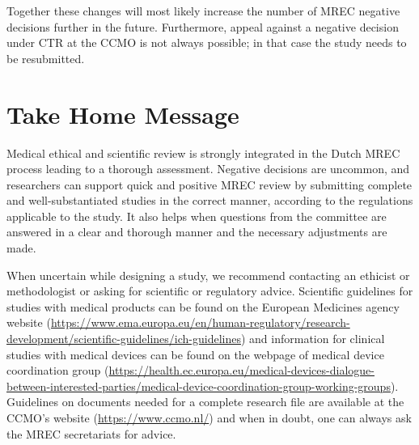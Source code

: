 \documentclass[authordate, empirical]{jote-new-article}
\begin{document}
	Together these changes will most likely increase the number of MREC negative decisions further in the future. Furthermore, appeal against a negative decision under CTR at the CCMO is not always possible; in that case the study needs to be resubmitted.







	\section{Take Home Message}



	Medical ethical and scientific review is strongly integrated in the Dutch MREC process leading to a thorough assessment. Negative decisions are uncommon, and researchers can support quick and positive MREC review by submitting complete and well-substantiated studies in the correct manner, according to the regulations applicable to the study. It also helps when questions from the committee are answered in a clear and thorough manner and the necessary adjustments are made.







	When uncertain while designing a study, we recommend contacting an ethicist or methodologist or asking for scientific or regulatory advice. Scientific guidelines for studies with medical products can be found on the European Medicines agency website (\href{https://www.ema.europa.eu/en/human-regulatory/research-development/scientific-guidelines/ich-guidelines}{https://www.ema.europa.eu/en/human-regulatory/research-development/scientific-guidelines/ich-guidelines}) and information for clinical studies with medical devices can be found on the webpage of medical device coordination group (\href{https://health.ec.europa.eu/medical-devices-dialogue-between-interested-parties/medical-device-coordination-group-working-groups}{https://health.ec.europa.eu/medical-devices-dialogue-between-interested-parties/medical-device-coordination-group-working-groups}). Guidelines on documents needed for a complete research file are available at the CCMO's website (\href{https://www.ccmo.nl/}{https://www.ccmo.nl/}) and when in doubt, one can always ask the MREC secretariats for advice.
\end{document}
